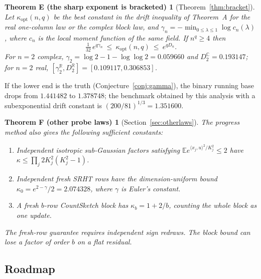 \documentclass[11pt,a4paper]{article}
\newtheorem*{thmE}{Theorem E (the sharp exponent is bracketed)}
\newtheorem*{thmF}{Theorem F (other probe laws)}
\theoremstyle{definition}\newtheorem{definition}[theorem]{Definition}
\theoremstyle{remark}\newtheorem{remark}[theorem]{Remark}
\numberwithin{equation}{section}
\newcommand{\E}{\mathbb E}
\newcommand{\R}{\mathbb R}
\newcommand{\C}{\mathbb C}
\newcommand{\opt}{\mathrm{opt}}
\begin{document}
\begin{thmE}[Theorem~\ref{thm:bracket}]
Let $\kappa_\opt(n,q)$ be the best constant in the drift inequality of
Theorem~A for the real one-column law or the complex block law, and
$\gamma_n=-\min_{0\le\lambda\le1}\log c_n(\lambda)$, where $c_n$ is the local
moment function of the same field. If $n^q\ge4$ then
\[
 \tfrac1{32}\,e^{q\gamma_n}\ \le\ \kappa_\opt(n,q)\ \le\ e^{qD_n}.
\]
For $n=2$ complex, $\gamma_2=\log2-1-\log\log2=0.059660$ and $D_2^{\C}=0.193147$;
for $n=2$ real, $[\gamma_2^{\R},D_2^{\R}]=[0.109117,0.306853]$.
\end{thmE}

If the lower end is the truth (Conjecture~\ref{conj:gamma}), the binary running
base drops from $1.441482$ to $1.378748$; the benchmark obtained by this analysis with a subexponential drift
constant is $(200/81)^{1/3}=1.351600$.

\begin{thmF}[Section~\ref{sec:otherlaws}]
The progress method also gives the following sufficient constants:
\begin{enumerate}[label=(\roman*)]
\item Independent isotropic sub-Gaussian factors satisfying
\(\E e^{\langle x_j,u\rangle^2/K_j^2}\le2\) have
\(\kappa\le\prod_j2K_j^2(K_j^2-1)\).
\item Independent fresh SRHT rows have the dimension-uniform bound
\(\kappa_0=e^{2-\gamma}/2=2.074328\), where \(\gamma\) is Euler's constant.
\item A fresh \(b\)-row CountSketch block has
\(\kappa_b=1+2/b\), counting the whole block as one update.
\end{enumerate}
The fresh-row guarantee requires independent sign redraws.
The block bound can lose a factor of order \(b\) on a flat residual.
\end{thmF}

\clearpage
\subsection{Roadmap}
\end{document}
